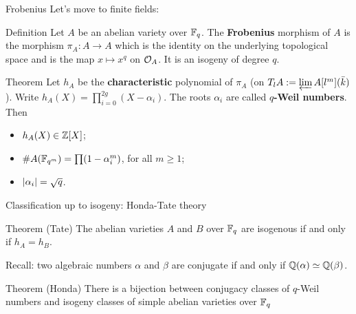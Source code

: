 \documentclass{beamer}
\begin{document}
\begin{frame}{Frobenius}
  Let's move to finite fields:
\pause
  \begin{block}{Definition}
    Let $A$ be an abelian variety over $\mathbb{F}_q$. The \textbf{Frobenius} morphism of $A$ is the morphism $\pi_A:A\to A$ which is the identity on the underlying topological space and is the map $x\mapsto x^q$ on ${\mathcal O}_A$. It is an isogeny of degree $q$.
  \end{block}
\pause
  \begin{alertblock}{Theorem}
    Let $h_A$ be the \textbf{characteristic} polynomial of $\pi_A$ (on $T_lA:= \varprojlim A[l^m](\bar k)$).
    Write $h_A(X)=\prod_{i=0}^{2g}(X-\alpha_i)$. The roots $\alpha_i$ are called \textbf{$q$-Weil numbers}. Then
 \pause   
    \begin{itemize}
      \item $h_A(X)\in \mathbb{Z}[X]$;
      \item $\# A(\mathbb{F}_{q^m})=\prod(1-\alpha_i^m)$, for all $m\geq 1$;
      \item $\left|\alpha_i\right|=\sqrt{q}$.
    \end{itemize}
  \end{alertblock}
\end{frame}

\begin{frame}{Classification up to isogeny: Honda-Tate theory}
  \begin{alertblock}{Theorem (Tate)}
    The abelian varieties $A$ and $B$ over $\mathbb{F}_q$ are isogenous if and only if $h_A = h_B$.
  \end{alertblock}
\pause
  Recall: two algebraic numbers $\alpha$ and $\beta$ are conjugate if and only if $\mathbb{Q}(\alpha)\simeq \mathbb{Q}(\beta)$.
  \begin{alertblock}{Theorem (Honda)}
    There is a bijection between conjugacy classes of $q$-Weil numbers and isogeny classes of simple abelian varieties over $\mathbb{F}_q$
  \end{alertblock}
\end{frame}
\end{document}
